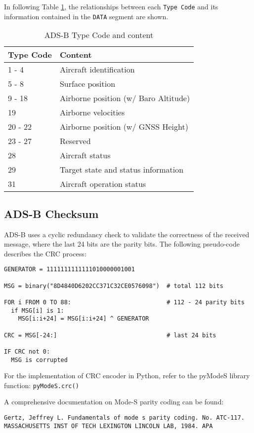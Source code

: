 In following Table \ref{tb:adsb-tc}, the relationships between each \texttt{Type\ Code} and its information contained in the \texttt{DATA} segment are shown.

\begin{table}[!ht]
\centering
\caption{ADS-B Type Code and content}
\label{tb:adsb-tc}
\begin{tabular}{@{}ll@{}}
\toprule
Type Code & Content                              \\ \midrule
1 - 4     & Aircraft identification              \\
5 - 8     & Surface position                     \\
9 - 18    & Airborne position (w/ Baro Altitude) \\
19        & Airborne velocities                  \\
20 - 22   & Airborne position (w/ GNSS Height)   \\
23 - 27   & Reserved                             \\
28        & Aircraft status                      \\
29        & Target state and status information  \\
31        & Aircraft operation status            \\ \bottomrule
\end{tabular}
\end{table}

\subsection{ADS-B Checksum}\label{ads-b-checksum}

ADS-B uses a cyclic redundancy check to validate the correctness of the received message, where the last 24 bits are the parity bits. The following pseudo-code describes the CRC process:

\begin{verbatim}
GENERATOR = 1111111111111010000001001

MSG = binary("8D4840D6202CC371C32CE0576098")  # total 112 bits

FOR i FROM 0 TO 88:                           # 112 - 24 parity bits
  if MSG[i] is 1:
    MSG[i:i+24] = MSG[i:i+24] ^ GENERATOR

CRC = MSG[-24:]                               # last 24 bits

IF CRC not 0:
  MSG is corrupted

\end{verbatim}

For the implementation of CRC encoder in Python, refer to the pyModeS library function: \texttt{pyModeS.crc()}

A comprehensive documentation on Mode-S parity coding can be found:

\begin{verbatim}
Gertz, Jeffrey L. Fundamentals of mode s parity coding. No. ATC-117.
MASSACHUSETTS INST OF TECH LEXINGTON LINCOLN LAB, 1984. APA
\end{verbatim}
